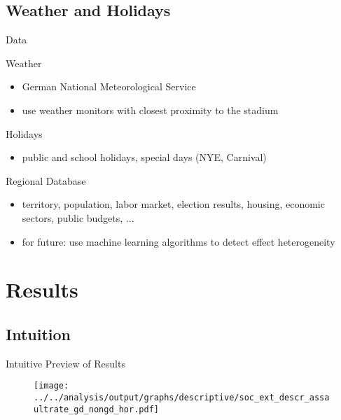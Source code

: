\documentclass[usenames,dvipsnames]{beamer} %
\begin{document}
	\subsection{Weather and Holidays}
	\begin{frame}{Data}\label{link_weather_data}
		\begin{block}{Weather}
			\begin{itemize}
				\item German National Meteorological Service
				\item use weather monitors with closest proximity to the stadium \newline \hyperlink{link_map_stadiums}{} \hyperlink{link_hist_dist_monitor_stadiums}{}
			\end{itemize}
		\end{block}
		\begin{block}{Holidays}
			\begin{itemize}
				\item public and school holidays, special days (NYE, Carnival)
			\end{itemize}	
		\end{block}
		\begin{block}{Regional Database}
			\begin{itemize}
				\item territory, population, labor market, election results, housing, economic sectors, public budgets, ... 
				\item for future: use machine learning algorithms to detect effect heterogeneity
			\end{itemize}
		\end{block}
	\end{frame}



	
\section{Results}
\subsection{Intuition}
	\begin{frame}{Intuitive Preview of Results}
		\begin{figure}
			\texttt{[image: ../../analysis/output/graphs/descriptive/soc\_ext\_descr\_assaultrate\_gd\_nongd\_hor.pdf]}
		\end{figure}
	\end{frame}
\end{document}
